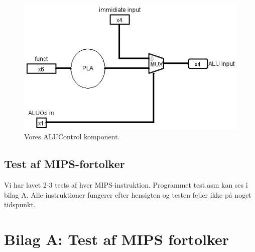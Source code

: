 \documentclass [10pt,a4paper]{article}
\begin{document}
\begin{figure}[h!]
  \centering  
    \includegraphics[scale=0.7]{ALUcontrol.png}
  \caption{Vores ALUControl komponent.}
\end{figure}

\subsection*{Test af MIPS-fortolker}
Vi har lavet 2-3 tests af hver MIPS-instruktion. Programmet test.asm
kan ses i bilag A. Alle instruktioner fungerer efter hensigten og
testen fejler ikke på noget tidspunkt.

\clearpage

\section*{Bilag A: Test af MIPS fortolker}

\end{document}
